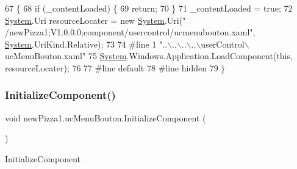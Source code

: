 \begin{DoxyCode}
67                                           \{
68             \textcolor{keywordflow}{if} (\_contentLoaded) \{
69                 \textcolor{keywordflow}{return};
70             \}
71             \_contentLoaded = \textcolor{keyword}{true};
72             \hyperlink{namespaceSystem}{System}.Uri resourceLocater = \textcolor{keyword}{new} \hyperlink{namespaceSystem}{System}.Uri(\textcolor{stringliteral}{"
      /newPizza1;V1.0.0.0;component/usercontrol/ucmenubouton.xaml"}, \hyperlink{namespaceSystem}{System}.UriKind.Relative);
73             
74 \textcolor{preprocessor}{            #line 1 "..\(\backslash\)..\(\backslash\)..\(\backslash\)..\(\backslash\)userControl\(\backslash\)ucMenuBouton.xaml"
}
75             \hyperlink{namespaceSystem}{System}.Windows.Application.LoadComponent(\textcolor{keyword}{this}, resourceLocater);
76             
77 \textcolor{preprocessor}{            #line default
}
78 \textcolor{preprocessor}{            #line hidden
}
79         \}
\end{DoxyCode}
\mbox{\label{classnewPizza1_1_1ucMenuBouton_a080790946e454afc7d1441447a1e2313}} 
\subsubsection{\texorpdfstring{Initialize\+Component()}{InitializeComponent()}\hspace{0.1cm}{\footnotesize\ttfamily [5/6]}}
{\footnotesize\ttfamily void new\+Pizza1.\+uc\+Menu\+Bouton.\+Initialize\+Component (\begin{DoxyParamCaption}{ }\end{DoxyParamCaption})\hspace{0.3cm}{\ttfamily [inline]}}



Initialize\+Component 


